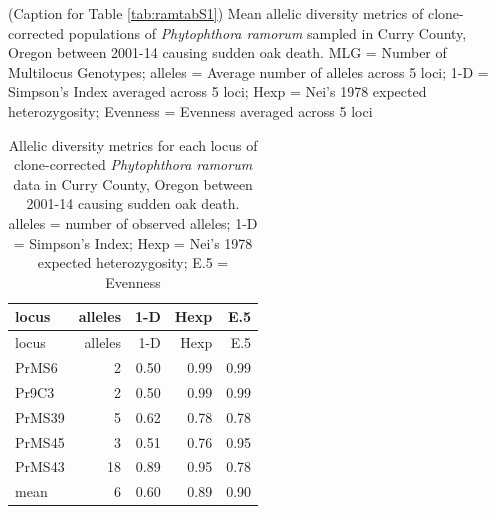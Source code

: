 \documentclass[double,11pt]{beavtex}
\begin{document}
  \begin{table}[ph!]
  \caption[Caption for Table \ref{tab:ramtabS1}]{(Caption for Table 
  \ref{tab:ramtabS1}) Mean allelic diversity metrics of
  clone-corrected populations of \emph{Phytophthora ramorum} sampled in
  Curry County, Oregon between 2001-14 causing sudden oak death. MLG =
  Number of Multilocus Genotypes; alleles = Average number of alleles
  across 5 loci; 1-D = Simpson's Index averaged across 5 loci; Hexp =
  Nei's 1978 expected heterozygosity; Evenness = Evenness averaged across
  5 loci}
  \label{cap:ramcapS1}
  \end{table}\vspace*{\fill}
  
  \renewcommand{\tablename}{Supplementary Table}
  \renewcommand{\thetable}{\arabic{chapter}.S\arabic{table}}
  
  
  \newpage
  
  \begin{longtable}[]{@{}lrrrr@{}}
  \caption{\label{tab:ramtabS2} Allelic diversity metrics for each locus of
  clone-corrected \emph{Phytophthora ramorum} data in Curry County, Oregon
  between 2001-14 causing sudden oak death. alleles = number of observed
  alleles; 1-D = Simpson's Index; Hexp = Nei's 1978 expected
  heterozygosity; E.5 = Evenness}\tabularnewline
  \toprule
  locus & alleles & 1-D & Hexp & E.5\tabularnewline
  \midrule
  \endfirsthead
  \toprule
  locus & alleles & 1-D & Hexp & E.5\tabularnewline
  \midrule
  \endhead
  PrMS6 & 2 & 0.50 & 0.99 & 0.99\tabularnewline
  Pr9C3 & 2 & 0.50 & 0.99 & 0.99\tabularnewline
  PrMS39 & 5 & 0.62 & 0.78 & 0.78\tabularnewline
  PrMS45 & 3 & 0.51 & 0.76 & 0.95\tabularnewline
  PrMS43 & 18 & 0.89 & 0.95 & 0.78\tabularnewline
  mean & 6 & 0.60 & 0.89 & 0.90\tabularnewline
  \bottomrule
  \end{longtable}
  
\end{document}
